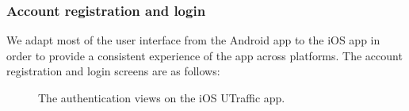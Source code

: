 \subsubsection{Account registration and login}
We adapt most of the user interface from the Android app to the iOS app in order to provide a consistent experience of the app across platforms. The account registration and login screens are as follows:
\begin{figure}[H]
    \centering
    \hspace{0.5cm} %
    \hspace{0.5cm} %
    \label{fig:ios_auth_views}
    \caption{The authentication views on the iOS UTraffic app.}
\end{figure}

